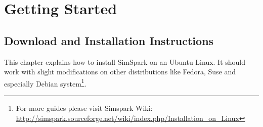
 \chapter{Getting Started}
\label{cha:getstarted}

\section{Download and Installation Instructions}
\label{section:install}


This chapter explains how to install SimSpark on an Ubuntu Linux. It should work with
slight modifications on other distributions like Fedora, Suse and
especially Debian system\footnote{For more guides please visit Simspark Wiki:
\url{http://simspark.sourceforge.net/wiki/index.php/Installation_on_Linux}}.

